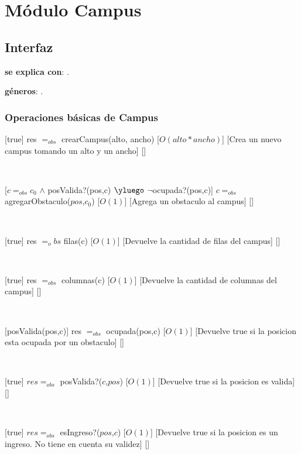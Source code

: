 \section{Módulo Campus}

\subsection{Interfaz}

\textbf{se explica con}: .

\textbf{géneros}: .

\subsubsection{Operaciones básicas de Campus}

[true]
{res $=_{obs}$ crearCampus(alto, ancho)}
[$O(alto * ancho)$]
[Crea un nuevo campus tomando un alto y un ancho]
[]

~

[$c =_{obs} c_0$ $\land$ posValida?(pos,c) $\yluego$ $\neg$ocupada?(pos,c)]
{$c =_{obs}$ agregarObstaculo($pos$,$c_0$)}
[$O(1)$]
[Agrega un obstaculo al campus]
[]

~

[true]
{res $=_obs$ filas(c)}
[$O(1)$]
[Devuelve la cantidad de filas del campus]
[]

~

[true]
{res $=_{obs}$ columnas(c)}
[$O(1)$]
[Devuelve la cantidad de columnas del campus]
[]

~


[posValida(pos,c)]
{res $=_{obs}$ ocupada(pos,c)}
[$O(1)$]
[Devuelve true si la posicion esta ocupada por un obstaculo]
[]

~

[true]
{$res =_{obs}$ posValida?($c$,$pos$)}
[$O(1)$]
[Devuelve true si la posicion es valida]
[]

~

[true]
{$res =_{obs}$ esIngreso?($pos$,$c$)}
[$O(1)$]
[Devuelve true si la posicion es un ingreso. No tiene en cuenta su validez]
[]

